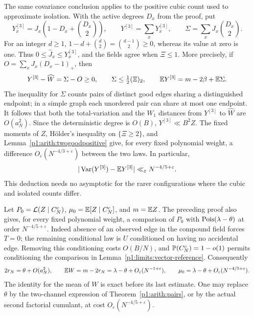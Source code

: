 The same covariance conclusion applies to the positive cubic
count used to approximate isolation.  With the active degrees
$D_x$ from the proof, put
\[
 Y_x^{[3]}=J_x\left(1-D_x+\binom{D_x}{2}\right),\qquad
 Y^{[3]}=\sum_xY_x^{[3]},\qquad
 \Sigma=\sum_xJ_x\binom{D_x}{2}.
\]
For an integer $d\ge1$, $1-d+\binom d2=\binom{d-1}{2}\ge0$,
whereas its value at zero is one.  Thus
$0\le\widehat J_x\le Y_x^{[3]}$, and the fields agree when
$\Xi\le1$.  More precisely, if
$O=\sum_xJ_x(D_x-1)_+$, then
\[
 Y^{[3]}-\widehat W=\Sigma-O\ge0,\qquad
 \Sigma\le\tfrac12(\Xi)_2,\qquad
 \E Y^{[3]}=m-2\beta+\E\Sigma.
\]
The inequality for $\Sigma$ counts pairs of distinct good
edges sharing a distinguished endpoint; in a simple graph
each unordered pair can share at most one endpoint.
It follows that both the total-variation and the
$W_1$ distances from $Y^{[3]}$ to $\widehat W$ are
$O(a_N^2)$.  Since the deterministic degree is $O(B)$,
$Y^{[3]}\ll B^2Z$.  The fixed moments of $Z$, H\"older's
inequality on $\{\Xi\ge2\}$, and
Lemma~\ref{p1:arith:twogoodpositive} give, for every fixed
polynomial weight, a difference
$O_\varepsilon(N^{-4/3+\varepsilon})$ between the two laws.
In particular,
\begin{equation}
 |\Var(Y^{[3]})-\E Y^{[3]}|
       \ll_\varepsilon N^{-4/5+\varepsilon}.
 \label{p1:limits:cubic-cumulant}
\end{equation}
This deduction needs no asymptotic for the rarer configurations
where the cubic and isolated counts differ.

Let $P_0=\Law(Z\mid C_N^c)$, $\mu_0=\E[Z\mid C_N^c]$,
and $m=\E Z$.  The preceding proof also gives, for every fixed
polynomial weight, a comparison of $P_0$ with
$\Pois(\lambda-\theta)$ at order $N^{-4/5+\varepsilon}$.
Indeed absence of an observed edge in the compound field forces
$T=0$; the remaining conditional law is $U$ conditioned on
having no accidental edge.  Removing this conditioning costs
$O(B/N)$, and $\P(C_N^c)=1-o(1)$ permits conditioning the
comparison in Lemma~\ref{p1:limits:vector-reference}.
Consequently
\begin{equation}
 2r_N=\theta+O(a_N^2),\qquad
 \E W=m-2r_N=\lambda-\theta+O_\varepsilon(N^{-1+\varepsilon}),\qquad
 \mu_0=\lambda-\theta+O_\varepsilon(N^{-4/5+\varepsilon}).
 \label{p1:limits:background-means}
\end{equation}
The identity for the mean of $W$ is exact before its last
estimate.  One may replace $\theta$ by the two-channel expression
of Theorem~\ref{p1:arith:pairs}, or by the actual second
factorial cumulant, at cost $O_\varepsilon(N^{-4/5+\varepsilon})$.


